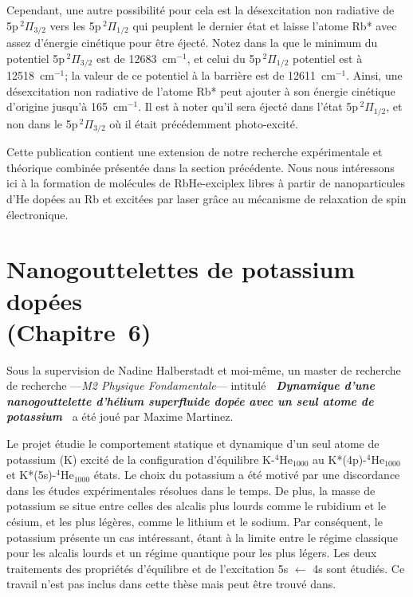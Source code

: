 		Cependant, une autre possibilité pour cela est la désexcitation non radiative de 5p$\,^2\Pi_{3/2}$ vers les 5p$\,^2\Pi_{1/2}$ qui peuplent le dernier état et laisse l'atome Rb* avec assez d'énergie cinétique pour être éjecté. Notez dans la  que le minimum du potentiel 5p$\,^2\Pi_{3/2}$ est de 12683~cm$^{-1}$, et celui du 5p$\,^2\Pi_{1/2}$ potentiel est à 12518~cm$^{-1}$; la valeur de ce potentiel à la barrière est de 12611~cm$^{-1}$. Ainsi, une désexcitation non radiative de l'atome Rb* peut ajouter à son énergie cinétique d'origine jusqu'à 165~cm$^{-1}$. Il est à noter qu'il sera éjecté dans l'état 5p$\,^2\Pi_{1/2}$, et non dans le 5p$\,^2\Pi_{3/2}$ où il était précédemment photo-excité.
		
		Cette publication contient une extension de notre recherche expérimentale et théorique combinée présentée dans la section précédente. Nous nous intéressons ici à la formation de molécules de RbHe-exciplex libres à partir de nanoparticules d'He dopées au Rb et excitées par laser grâce au mécanisme de relaxation de spin électronique.

	\section*{Nanogouttelettes de potassium dopées\\\small(Chapitre~6)}
		Sous la supervision de Nadine Halberstadt et moi-même, un master de recherche de recherche ---\emph{M2 Physique Fondamentale}--- intitulé \emph{\textbf{\guillemotleft~Dynamique d'une nanogouttelette d'hélium superfluide dopée avec un seul atome de potassium~\guillemotright}} a été joué par Maxime Martinez.
		
		Le projet étudie le comportement statique et dynamique d'un seul atome de potassium (K) excité de la configuration d'équilibre K-$^4$He$_{1000}$ au K*(4p)-$^4$He$_{1000}$ et K*(5s)-$^4$He$_{1000}$ états. Le choix du potassium a été motivé par une discordance dans les études expérimentales résolues dans le temps\citep{Schulz2001,Reho2000-1,Reho2000-2}. De plus, la masse de potassium se situe entre celles des alcalis plus lourds comme le rubidium et le césium, et les plus légères, comme le lithium et le sodium. Par conséquent, le potassium présente un cas intéressant, étant à la limite entre le régime classique pour les alcalis lourds et un régime quantique pour les plus légers. Les deux traitements des propriétés d'équilibre et de l'excitation 5s $\leftarrow$ 4s sont étudiés. Ce travail n'est pas inclus dans cette thèse mais peut être trouvé dans.
		
